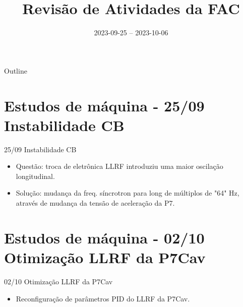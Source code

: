 \documentclass{beamer}					%
\title{Revisão de Atividades da FAC}	%
\institute{LNLS.DAC.FAC}					%
\date{2023-09-25 -- 2023-10-06}									%
\begin{document}
\begin{frame}
  \titlepage
  \href{https://github.com/lnls-fac/doc-review-dac-fac}{}
\end{frame}

\begin{frame}{Outline}
  \tableofcontents
\end{frame}

%


\section{Estudos de máquina - 25/09 Instabilidade CB}

\begin{frame}{25/09 Instabilidade CB}
    \begin{itemize}
		\item Questão: troca de eletrônica LLRF introduziu uma maior oscilação longitudinal.
        \item Solução: mudança da freq. síncrotron para long de múltiplos de "64" Hz, através de mudança da tensão de aceleração da P7.
	\end{itemize}
\end{frame}



\section{Estudos de máquina - 02/10 Otimização LLRF da P7Cav}

\begin{frame}{02/10 Otimização LLRF da P7Cav}
    \begin{itemize}
		\item Reconfiguração de parâmetros PID do LLRF da P7Cav.
	\end{itemize}
\end{frame}
\end{document}
